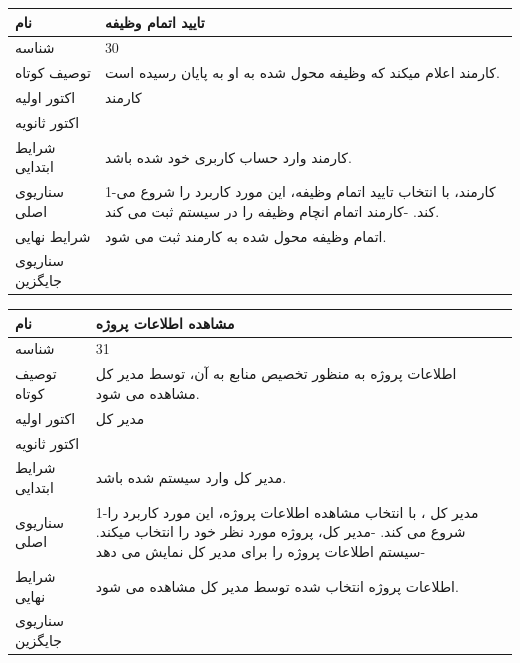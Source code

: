 \vspace{2cm}

\begin{tabular}{|p{2cm}|p{10cm}|}
\hline
نام
&
تایید اتمام وظیفه
\\
\hline
شناسه
&
30
\\
\hline
توصیف کوتاه  
&
کارمند اعلام میکند که وظیفه محول شده به او به پایان رسیده است.
\\
\hline
اکتور اولیه
&
کارمند
\\
\hline
اکتور ثانویه
&

\\
\hline
شرایط ابتدایی
&
 کارمند وارد حساب کاربری خود شده باشد. 
\\
\hline
سناریوی اصلی
&
1-کارمند، با انتخاب تایید اتمام وظیفه، این مورد کاربرد را شروع می کند.
\newline
2-کارمند اتمام انچام وظیفه را در سیستم ثبت می کند.
\\
\hline
شرایط نهایی
&
اتمام وظیفه محول شده به کارمند ثبت می شود.
\\
\hline
سناریوی جایگزین
&

\\
\hline
\end{tabular}

\vspace{2cm}

\begin{tabular}{|p{2cm}|p{10cm}|}
\hline
نام
&
مشاهده  اطلاعات پروژه
\\
\hline
شناسه
&
31
\\
\hline
توصیف کوتاه
&
اطلاعات پروژه به منظور تخصیص منابع به آن، توسط مدیر کل مشاهده می شود.
\\
\hline
اکتور اولیه
&
مدیر کل
\\
\hline
اکتور ثانویه
&

\\
\hline
شرایط ابتدایی
&
مدیر کل وارد سیستم شده باشد. 
\\
\hline
سناریوی اصلی
&
1-مدیر کل ، با انتخاب مشاهده  اطلاعات پروژه، این مورد کاربرد را شروع می کند.
\newline
2-مدیر کل، پروژه مورد نظر خود را انتخاب میکند.
\newline
3-سیستم اطلاعات پروژه را برای مدیر کل نمایش می دهد
\\
\hline
شرایط نهایی
&
اطلاعات پروژه  انتخاب شده توسط مدیر کل مشاهده می شود.
\\
\hline
سناریوی جایگزین
&

\\
\hline
\end{tabular}

